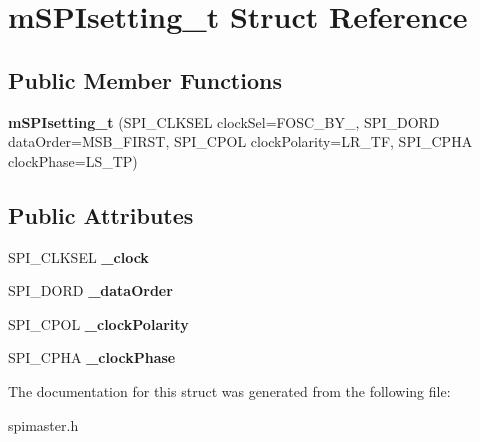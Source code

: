 \hypertarget{structmSPIsetting__t}{}\section{m\+S\+P\+Isetting\+\_\+t Struct Reference}
\label{structmSPIsetting__t}
\subsection*{Public Member Functions}
\begin{DoxyCompactItemize}
\item 
\mbox{\label{structmSPIsetting__t_a8e24b798a3f9dcd4f90fadffbcab0503}} 
{\bfseries m\+S\+P\+Isetting\+\_\+t} (S\+P\+I\+\_\+\+C\+L\+K\+S\+EL clock\+Sel=F\+O\+S\+C\+\_\+\+B\+Y\+\_, S\+P\+I\+\_\+\+D\+O\+RD data\+Order=M\+S\+B\+\_\+\+F\+I\+R\+ST, S\+P\+I\+\_\+\+C\+P\+OL clock\+Polarity=L\+R\+\_\+\+TF, S\+P\+I\+\_\+\+C\+P\+HA clock\+Phase=L\+S\+\_\+\+TP)
\end{DoxyCompactItemize}
\subsection*{Public Attributes}
\begin{DoxyCompactItemize}
\item 
\mbox{\label{structmSPIsetting__t_a808514c1d694629406dbafc8d09d6aac}} 
S\+P\+I\+\_\+\+C\+L\+K\+S\+EL {\bfseries \+\_\+clock}
\item 
\mbox{\label{structmSPIsetting__t_a8de7023e2f95faed221ee03a3cf5dd93}} 
S\+P\+I\+\_\+\+D\+O\+RD {\bfseries \+\_\+data\+Order}
\item 
\mbox{\label{structmSPIsetting__t_aa831f0b03d1dfad178c75dc2d4f70904}} 
S\+P\+I\+\_\+\+C\+P\+OL {\bfseries \+\_\+clock\+Polarity}
\item 
\mbox{\label{structmSPIsetting__t_ae5bee01044abda654f22370844528d21}} 
S\+P\+I\+\_\+\+C\+P\+HA {\bfseries \+\_\+clock\+Phase}
\end{DoxyCompactItemize}


The documentation for this struct was generated from the following file\+:\begin{DoxyCompactItemize}
\item 
spimaster.\+h\end{DoxyCompactItemize}
